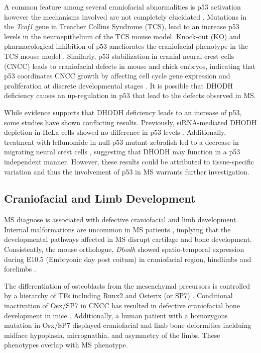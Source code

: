 \documentclass[12pt]{article}
\begin{document}
	A common feature among several craniofacial abnormalities is p53 activation however the mechanisms involved are not completely elucidated \citep{jones2008prevention, barlow2010p53, boultwood2012haploinsufficiency, sakai2016prevention}. Mutations in the \textit{Tcof1} gene in Treacher Collins Syndrome (TCS), lead to an increase p53 levels in the neuroepithelium of the TCS mouse model. Knock-out (KO) and pharmacological inhibition of p53 ameliorates the craniofacial phenotype in the TCS mouse model \citep{jones2008prevention, sakai2016prevention}. Similarly, p53 stabilization in cranial neural crest cells (CNCC) leads to craniofacial defects in mouse and chick embryos, indicating that p53 coordinates CNCC growth by affecting cell cycle gene expression and proliferation at discrete developmental stages \citep{Rinon1827}. It is possible that DHODH deficiency causes an up-regulation in p53 that lead to the defects observed in MS.
	
	While evidence supports that DHODH deficiency leads to an increase of p53, some studies have shown conflicting results. Previously, siRNA-mediated DHODH depletion in HeLa cells showed no difference in p53 levels \citep{fang2013dihydro}. Additionally, treatment with leflunomide in null-p53 mutant zebrafish led to a decrease in migrating neural crest cells \citep{white2011dhodh},  suggesting that DHODH may function in a p53 independent manner. However, these results could be attributed to tissue-specific variation and thus the involvement of p53 in MS warrants further investigation.
	
	\subsection{Craniofacial and Limb Development}
	MS diagnose is associated with defective craniofacial and limb development. Internal malformations are uncommon in MS patients \citep{doi:10.1093/hmg/dds218}, implying that the developmental pathways affected in MS disrupt cartilage and bone development. Consistently, the mouse orthologue, \textit{Dhodh } showed spatio-temporal expression during E10.5 (Embryonic day post coitum) in craniofacial region, hindlimbs and forelimbs \citep{doi:10.1093/hmg/dds218}. 
	
	 The differentiation of osteoblasts from the mesenchymal precursors is controlled by a hierarchy of TFs including Runx2 and Osterix (or SP7) \citep{karsenty2009genetic}. Conditional inactivation of Osx/SP7 in CNCC has resulted in defective craniofacial bone development in mice  \citep{baek2013osterix}. Additionally, a human patient with a homozygous mutation in Osx/SP7 displayed craniofacial and limb bone deformities \citep{lapunzina2010identification} inclduing midface hypoplasia, micrognathia,  and asymmetry of the limbs. These phenotypes overlap with MS phenotype.
	 	
\end{document}
